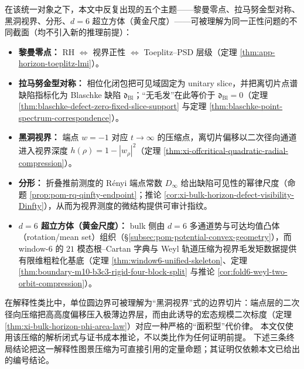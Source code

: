 在该统一对象之下，本文中反复出现的五个主题——黎曼零点、拉马努金型对称、黑洞视界、分形、\(d=6\) 超立方体（黄金尺度）——可被理解为同一正性问题的不同截面（均不引入新的推理前提）：
\begin{itemize}
  \item \textbf{黎曼零点：} RH \(\Leftrightarrow\) 视界正性 \(\Leftrightarrow\) Toeplitz--PSD 层级（定理 \ref{thm:app-horizon-toeplitz-lmi}）。
  \item \textbf{拉马努金型对称：} 相位化闭包把可见域固定为 unitary slice，并把离切片点谱缺陷指标化为 Blaschke 缺陷 \(\mathfrak d_{\mathrm{Bl}}\)；“无毛发”在此等价于 \(\mathfrak d_{\mathrm{Bl}}=0\)（定理 \ref{thm:blaschke-defect-zero-fixed-slice-support} 与定理 \ref{thm:blaschke-point-spectrum-correspondence}）。
  \item \textbf{黑洞视界：} 端点 \(w=-1\) 对应 \(t\to\infty\) 的压缩点，离切片偏移以二次径向通道进入视界深度 \(h(\rho)=1-|w_\rho|^2\)（定理 \ref{thm:xi-offcritical-quadratic-radial-compression}）。
  \item \textbf{分形：} 折叠推前测度的 Rényi 端点常数 \(D_\infty\) 给出缺陷可见性的幂律尺度（命题 \ref{prop:pom-rq-qinfty-endpoint}；推论 \ref{cor:xi-bulk-horizon-defect-visibility-Dinfty}），从而为视界测度的微结构提供可审计指纹。
  \item \textbf{\(d=6\) 超立方体（黄金尺度）：} bulk 侧由 \(d=6\) 多通道势与可达均值凸体（rotation/mean set）组织（\S\ref{subsec:pom-potential-convex-geometry}），而 window-\(6\) 的 \(21\) 模态根--Cartan 字典与 Weyl 轨道压缩为视界毛发矩数据提供有限维粗粒化基底（定理 \ref{thm:window6-unified-skeleton}、定理 \ref{thm:boundary-m10-b3c3-rigid-four-block-split} 与推论 \ref{cor:fold6-weyl-two-orbit-compression}）。
\end{itemize}

在解释性类比中，单位圆边界可被理解为“黑洞视界”式的边界切片：端点层的二次径向压缩把高高度偏移压入极薄边界层，而由此诱导的宏态规模二次标度（定理 \ref{thm:xi-bulk-horizon-phi-area-law}）对应一种严格的“面积型”代价律。
本文仅使用该压缩的解析闭式与证书成本推论，不以类比作为任何证明前提。
下述三条终局结论把这一解释性图景压缩为可直接引用的定量命题；其证明仅依赖本文已给出的编号结论。

